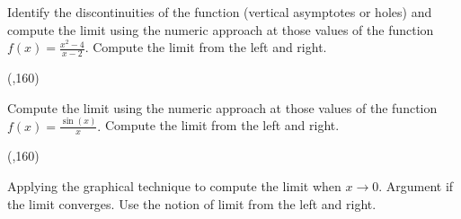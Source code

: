 \begin{preguntas}

\pregunta[20] Identify the discontinuities of the function (vertical asymptotes or holes) and compute the limit using the numeric approach at those values of the function \(f(x)=\frac{x^2-4}{x-2}.\)
Compute the limit from the left and right.

\begin{center}
    \framebox(\textwidth,160){} 
\end{center}






\pregunta[20] Compute the limit using the numeric approach at those values of the function \(f(x)=\frac{\sin(x)}{x}.\)
Compute the limit from the left and right.

\begin{center}
    \framebox(\textwidth,160){} 
\end{center}


\newpage

\begin{minipage}{0.6\textwidth}
\pregunta[10] Applying the graphical technique to compute the limit when $x\to 0$.
Argument if the limit converges.
Use the notion of limit from the left and right.
\end{minipage}
\begin{minipage}{0.4\textwidth}
\end{minipage}
\end{preguntas}
